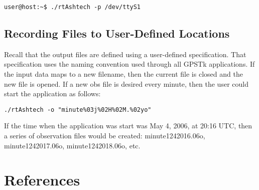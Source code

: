 \small
\begin{singlespace}
\begin{verbatim}
user@host:~$ ./rtAshtech -p /dev/ttyS1
\end{verbatim}
\end{singlespace}
\normalsize

\subsection{Recording Files to User-Defined Locations}

Recall that the output files are defined using a user-defined specification.
That specification uses the naming convention used through all GPSTk
applications. If the input data maps to a new filename, then the current
file is closed and the new file is opened. If a new obs file is desired 
every minute, then the user could start the application as follows:

\small
\begin{singlespace}
\begin{verbatim}
./rtAshtech -o "minute%03j%02H%02M.%02yo"
\end{verbatim}
\end{singlespace}
\normalsize

If the time when the application was start was May 4, 2006, at 20:16 UTC, then
a series of observation files would be created: minute1242016.06o, 
minute1242017.06o, minute1242018.06o, etc. 

\section{References}


